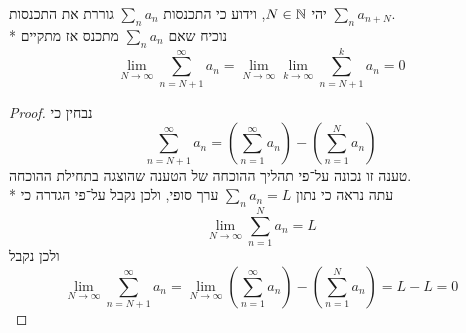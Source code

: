 \Question{}
יהי $N \in \mathbb{N}$, וידוע כי התכנסות $\sum_n a_n$ גוררת את התכנסות $\sum_n a_{n + N}$. \\*
נוכיח שאם $\sum_n a_n$ מתכנס אז מתקיים
\[
	\lim_{N \to \infty} \sum_{n = N + 1}^{\infty} a_n = \lim_{N \to \infty} \lim_{k \to \infty} \sum_{n = N + 1}^{k} a_n = 0
\]
\begin{proof}
	נבחין כי
	\[
		\sum_{n = N + 1}^\infty a_n = \left(\sum_{n = 1}^{\infty} a_n\right) - \left( \sum_{n = 1}^{N} a_n \right)
	\]
	טענה זו נכונה על־פי תהליך ההוכחה של הטענה שהוצגה בתחילת ההוכחה. \\*
	עתה נראה כי נתון $\sum_n a_n = L$ ערך סופי, ולכן נקבל על־פי הגדרה כי
	\[
		\lim_{N \to \infty} \sum_{n = 1}^{N} a_n = L
	\]
	ולכן נקבל
	\[
		\lim_{N \to \infty} \sum_{n = N + 1}^\infty a_n
		= \lim_{N \to \infty} \left(\sum_{n = 1}^{\infty} a_n\right) - \left( \sum_{n = 1}^{N} a_n \right)
		= L - L
		= 0
	\]
\end{proof}

